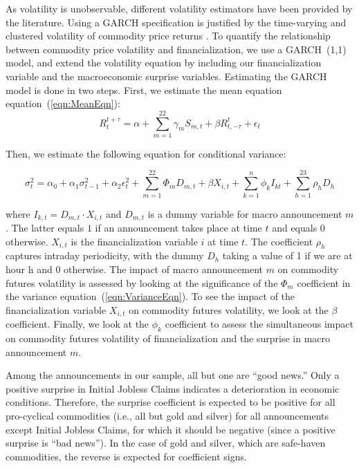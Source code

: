 As  volatility is unobservable, different volatility estimators have been provided by the literature. 
Using a GARCH specification is justified by the time-varying and clustered volatility of commodity price returns  \citep*[see e.g.,][]{hammoudeh2008metal}.
To quantify the relationship between commodity price volatility and financialization, we use a GARCH~(1,1) model, and extend the volatility equation by including our financialization variable  and the macroeconomic surprise variables. Estimating the GARCH model is done in two steps. 
 First, we estimate the mean equation equation~(\ref{eqn:MeanEqn}):
\begin{equation}\label{eqn:MeanEqn}
R_{t}^{t+\tau}=\alpha+\sum_{m=1}^{22} \gamma_m S_{m,t}+\beta R_{t,-\tau}^{t}+\epsilon_{t}
\end{equation}

Then, we estimate  the following equation for conditional variance:

\begin{equation}\label{eqn:VarianceEqn}
\sigma_{t}^2=\alpha_0+\alpha_1 \sigma_{t-1}^2+\alpha_2 \epsilon_t^2 +\sum_{m=1}^{22} \Phi_m D_{m,t}+\beta X_{i,t}+\sum_{k=1}^n \phi_k I_{kt} + \sum_{h=1}^{23} \rho_h D_h
\end{equation}

where $I_{k,t}=D_{m,t} \cdot X_{i,t}$ and $D_{m,t}$ is a dummy variable for macro announcement $m$. The  latter equals $1$ if an announcement takes place at time $t$ and equals 0 otherwise. $X_{i,t}$  is the financialization variable $i$ at  time $t$. The coefficient $\rho_h$ captures intraday periodicity, with the dummy $D_h$ taking a value of 1 if we are at hour h and 0 otherwise. The impact of macro announcement $m$ on commodity futures volatility is assessed by looking at the significance of the $\Phi_m$ coefficient in the variance equation~(\ref{eqn:VarianceEqn}). To see the impact of the financialization variable $X_{i,t}$ on commodity futures volatility, we look at the  $\beta$ coefficient. Finally, we look at the  $\phi_k$ coefficient to assess the simultaneous impact on commodity futures volatility of  financialization  and the surprise in macro announcement $m$. 

Among the announcements in our sample, all but one are ``good news.'' Only a positive surprise in Initial Jobless Claims indicates a deterioration in economic conditions. Therefore, the surprise coefficient is expected to be positive for all pro-cyclical commodities (i.e., all but gold and silver) for all announcements except Initial Jobless Claims, for which it should be negative (since a positive surprise is ``bad news''). In the case of gold and silver, which are safe-haven commodities, the reverse is expected for coefficient signs.

